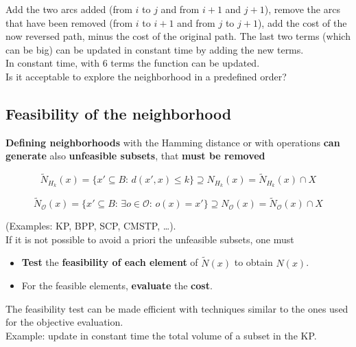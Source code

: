 Add the two arcs added (from $i$ to $j$ and from $i+1$ and $j+1$), remove the arcs that have been removed (from $i$ to $i+1$ and from $j$ to $j+1$), add the cost of the now reversed path, minus the cost of the original path. The last two terms (which can be big) can be updated in constant time by adding the new terms.\\
In constant time, with $6$ terms the function can be updated.\\

Is it acceptable to explore the neighborhood in a predefined order?

\newpage

\subsection{Feasibility of the neighborhood}
\textbf{Defining neighborhoods} with the Hamming distance or with operations \textbf{can generate} also \textbf{unfeasible subsets}, that \textbf{must be removed}

$$ \tilde{N}_{H_k} (x) = \{x' \subseteq B : \, d (x', x) \leq k \} \supseteq N_{H_k} (x) = \tilde{N}_{H_k} (x) \cap X $$

$$ \tilde{N}_{\mathcal{O}} (x) = \{ x' \subseteq B : \, \exists o \in \mathcal{O} : \, o (x) = x' \} \supseteq N_{\mathcal{O}} (x) = \tilde{N}_{\mathcal{O}} (x) \cap X $$

(Examples: KP, BPP, SCP, CMSTP, \dots).\\

If it is not possible to avoid a priori the unfeasible subsets, one must
\begin{itemize}
	\item \textbf{Test} the \textbf{feasibility of each element} of $\tilde{N} (x)$ to obtain $N (x)$.\\
	
	\item For the feasible elements, \textbf{evaluate} the \textbf{cost}.\\
\end{itemize}

The feasibility test can be made efficient with techniques similar to the ones used for the objective evaluation.\\

Example: update in constant time the total volume of a subset in the KP.\\

\newpage

